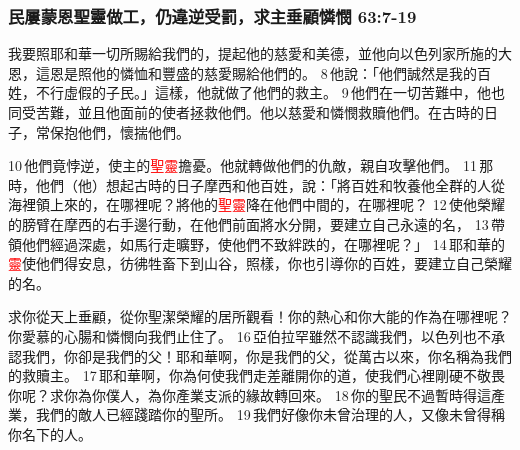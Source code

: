 \subsubsection{民屢蒙恩聖靈做工，仍違逆受罰，求主垂顧憐憫 63:7-19}
我要照耶和華一切所賜給我們的，提起他的慈愛和美德，並他向以色列家所施的大恩，這恩是照他的憐恤和豐盛的慈愛賜給他們的。 8 他說：「他們誠然是我的百姓，不行虛假的子民。」這樣，他就做了他們的救主。 9 他們在一切苦難中，他也同受苦難，並且他面前的使者拯救他們。他以慈愛和憐憫救贖他們。在古時的日子，常保抱他們，懷揣他們。

10 他們竟悖逆，使主的\textcolor{red}{聖靈}擔憂。他就轉做他們的仇敵，親自攻擊他們。 11 那時，他們（他）想起古時的日子摩西和他百姓，說：「將百姓和牧養他全群的人從海裡領上來的，在哪裡呢？將他的\textcolor{red}{聖靈}降在他們中間的，在哪裡呢？ 12 使他榮耀的膀臂在摩西的右手邊行動，在他們前面將水分開，要建立自己永遠的名， 13 帶領他們經過深處，如馬行走曠野，使他們不致絆跌的，在哪裡呢？」 14 耶和華的\textcolor{red}{靈}使他們得安息，彷彿牲畜下到山谷，照樣，你也引導你的百姓，要建立自己榮耀的名。

求你從天上垂顧，從你聖潔榮耀的居所觀看！你的熱心和你大能的作為在哪裡呢？你愛慕的心腸和憐憫向我們止住了。 16 亞伯拉罕雖然不認識我們，以色列也不承認我們，你卻是我們的父！耶和華啊，你是我們的父，從萬古以來，你名稱為我們的救贖主。 17 耶和華啊，你為何使我們走差離開你的道，使我們心裡剛硬不敬畏你呢？求你為你僕人，為你產業支派的緣故轉回來。 18 你的聖民不過暫時得這產業，我們的敵人已經踐踏你的聖所。 19 我們好像你未曾治理的人，又像未曾得稱你名下的人。

